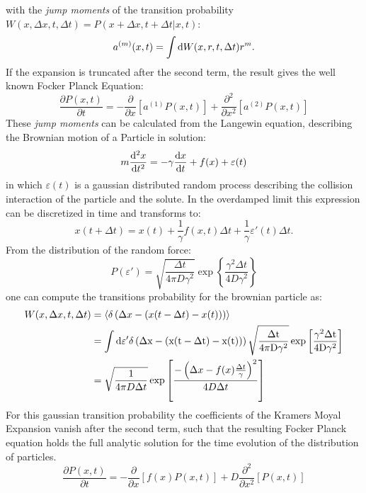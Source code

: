 with the {\it jump moments} of the transition probability $W(x,\Delta x,t, \Delta t) = P(x+\Delta x,t+\Delta t | x, t)$:
\begin{equation}
    a^{(m)}(x,t) = \int {\rm d} W(x,r,t, \Delta t) r^m .
    \label{jump moments}
\end{equation}
If the expansion is truncated after the second term, the result gives the well known Focker Planck Equation:
\begin{equation}
    \frac{\partial P(x,t)}{\partial t} = - \frac{\partial}{\partial x} \left[a^{(1)}P(x,t) \right] + \frac{\partial^2}{\partial x^2}\left[ a^{(2)}P(x,t) \right] 
    \label{FPE}
\end{equation}
These {\it jump moments} can be calculated from the Langewin equation, describing the 
Brownian motion of a Particle in solution:
\begin{equation}
    m \frac{{\rm d}^2 x}{{\rm d}t^2} = -\gamma \frac{ {\rm d}x}{{\rm d}t} + f(x) + \varepsilon(t)
    \label{Langewin equation}
\end{equation}
in which $\varepsilon(t)$ is a gaussian distributed random process describing the 
collision interaction of the particle and the solute. 
In the overdamped limit this expression can be discretized in time and transforms to:
\begin{equation}
        x(t + \Delta t) = x(t) + \frac{1}{\gamma}f(x,t) \Delta t + \frac{1}{\gamma} \varepsilon'(t) \Delta t.
    \label{overdamped limit}
\end{equation}
From the distribution of the random force:
\begin{equation}
    P(\varepsilon ' ) = \sqrt{\frac{\Delta t}{4 \pi D \gamma^{2}}} \exp \left\{ \frac{\gamma^{2} \Delta t}{4 D \gamma^{2}} \right\}
    \label{eps dist}
\end{equation}
one can compute the transitions probability for the brownian particle as:
\begin{align}
    W(x,\Delta x,t, \Delta t)  &= \left< \delta \left(  \Delta x - (x(t-\Delta t) - x(t)) \right)\right> \\
                        &= \int \rm{d}\varepsilon ' \delta \left(  \Delta x - (x(t-\Delta t) - x(t)) \right)  \sqrt{\frac{\Delta t}{4 \pi D \gamma^{2}}} \exp \left[ \frac{\gamma^{2} \Delta t}{4 D \gamma^{2}} \right] \\
                        &= \sqrt{\frac{1}{4 \pi D \Delta t}} \exp \left[ \frac{-\left(\Delta x - f(x) \frac{\Delta t}{\gamma} \right)^2}{4 D \Delta t} \right]
    \label{W}
\end{align}
For this gaussian transition probability the coefficients of the Kramers Moyal Expansion vanish after the second term, such that the resulting Focker Planck equation holds the full analytic solution for the time evolution of the distribution of particles.
\begin{equation}
    \frac{\partial P(x,t)}{\partial t} = - \frac{\partial}{\partial x} \left[f(x)P(x,t) \right] + D\frac{\partial^2}{\partial x^2}\left[P(x,t) \right] 
    \label{FPE2}
\end{equation}

